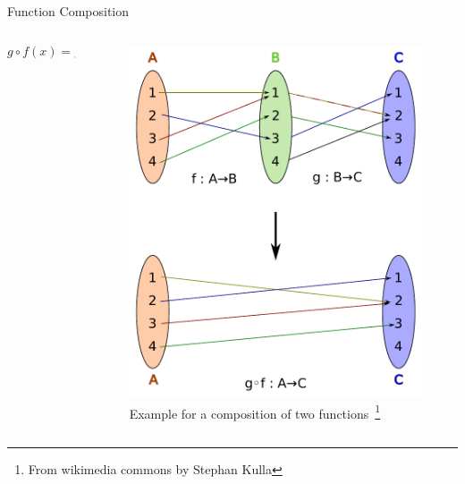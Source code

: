 \documentclass[10pt]{beamer}
\begin{document}


\begin{frame}{Function Composition}

     
     
\begin{columns}
\begin{column}{0.4\textwidth}
   
     \begin{equation*}
         g\circ f(x)=g(f(x))
     \end{equation*}
     
\end{column}
\begin{column}{0.6\textwidth}  %
    
  \begin{figure}
  \includegraphics[width=.75\textwidth,keepaspectratio] {Example_for_a_composition_of_two_functions.pdf}
    \caption{Example for a composition of two functions~\footnote[frame]{From wikimedia commons by Stephan Kulla}}
  \end{figure}
\end{column}

\end{columns}
  
    
\end{frame}

\end{document}
